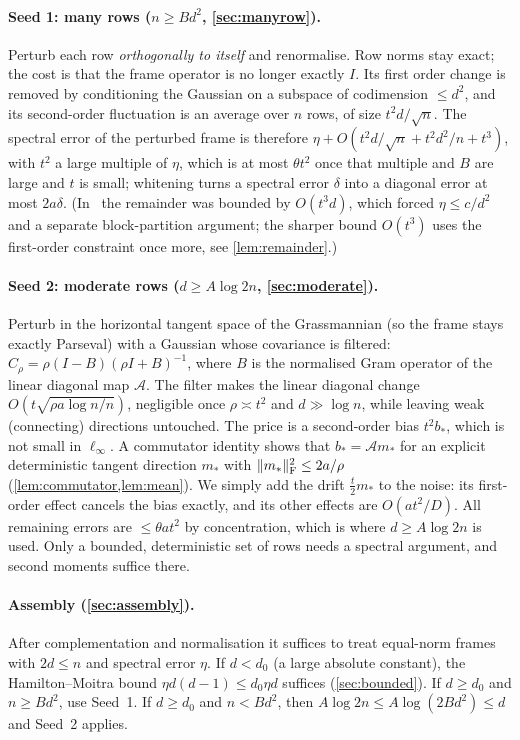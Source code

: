 \paragraph{Seed 1: many rows ($n\ge Bd^2$, \cref{sec:manyrow}).}
Perturb each row \emph{orthogonally to itself} and renormalise. Row norms stay
exact; the cost is that the frame operator is no longer exactly $I$. Its first
order change is removed by conditioning the Gaussian on a subspace of
codimension $\le d^2$, and its second-order fluctuation is an average over $n$
rows, of size $t^2d/\sqrt n$. The spectral error of the perturbed frame is
therefore $\eta+O(t^2d/\sqrt n+t^2d^2/n+t^3)$, with $t^2$ a large multiple of $\eta$, which is
at most $\theta t^2$ once that multiple and $B$ are large and $t$ is small; whitening
turns a spectral error $\delta$ into a diagonal error at most $2a\delta$.
(In~\cite{Orig} the remainder was bounded by $O(t^3d)$, which forced
$\eta\le c/d^2$ and a separate block-partition argument; the sharper bound
$O(t^3)$ uses the first-order constraint once more, see \cref{lem:remainder}.)

\paragraph{Seed 2: moderate rows ($d\ge A\log 2n$, \cref{sec:moderate}).}
Perturb in the horizontal tangent space of the Grassmannian (so the frame stays
exactly Parseval) with a Gaussian whose covariance is filtered:
$C_\rho=\rho(I-B)(\rho I+B)^{-1}$, where $B$ is the normalised Gram operator of
the linear diagonal map $\mathcal A$. The filter makes the linear diagonal change
$O(t\sqrt{\rho a\log n/n})$, negligible once $\rho\asymp t^2$ and $d\gg\log n$,
while leaving weak (connecting) directions untouched. The price is a
second-order bias $t^2b_*$, which is not small in $\ell_\infty$. A commutator
identity shows that $b_*=\mathcal Am_*$ for an explicit deterministic tangent
direction $m_*$ with $\lVert m_*\rVert_{\mathrm F}^2\le2a/\rho$ (\cref{lem:commutator,lem:mean}). We
simply add the drift $\frac t2m_*$ to the noise: its first-order effect cancels the
bias exactly, and its other effects are $O(at^2/D)$. All remaining errors are
$\le\theta at^2$ by concentration, which is where $d\ge A\log 2n$ is used. Only
a bounded, deterministic set of rows needs a spectral argument, and second
moments suffice there.

\paragraph{Assembly (\cref{sec:assembly}).}
After complementation and normalisation it suffices to treat equal-norm frames
with $2d\le n$ and spectral error $\eta$. If $d<d_0$ (a large absolute constant),
the Hamilton--Moitra bound $\eta d(d-1)\le d_0\eta d$ suffices
(\cref{sec:bounded}). If $d\ge d_0$ and $n\ge Bd^2$, use Seed~1. If $d\ge d_0$ and
$n<Bd^2$, then $A\log 2n\le A\log(2Bd^2)\le d$ and Seed~2 applies.

